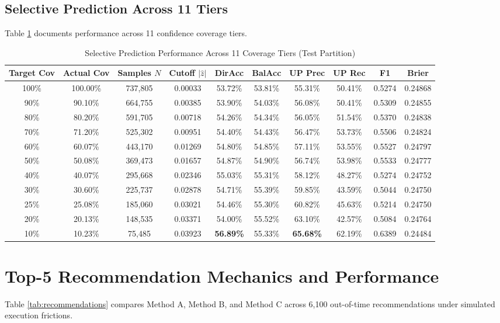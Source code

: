 \documentclass[11pt,a4paper]{article}
\begin{document}
\subsection{Selective Prediction Across 11 Tiers}
Table \ref{tab:selective} documents performance across 11 confidence coverage tiers.

\begin{table}[H]
\centering
\small
\caption{Selective Prediction Performance Across 11 Coverage Tiers (Test Partition)}
\label{tab:selective}
\begin{tabular}{cccccccccc}
\toprule
\textbf{Target Cov} & \textbf{Actual Cov} & \textbf{Samples $N$} & \textbf{Cutoff $|\hat{z}|$} & \textbf{DirAcc} & \textbf{BalAcc} & \textbf{UP Prec} & \textbf{UP Rec} & \textbf{F1} & \textbf{Brier} \\
\midrule
100\% & 100.00\% & 737,805 & 0.00033 & 53.72\% & 53.81\% & 55.31\% & 50.41\% & 0.5274 & 0.24868 \\
90\% & 90.10\% & 664,755 & 0.00385 & 53.90\% & 54.03\% & 56.08\% & 50.41\% & 0.5309 & 0.24855 \\
80\% & 80.20\% & 591,705 & 0.00718 & 54.26\% & 54.34\% & 56.05\% & 51.54\% & 0.5370 & 0.24838 \\
70\% & 71.20\% & 525,302 & 0.00951 & 54.40\% & 54.43\% & 56.47\% & 53.73\% & 0.5506 & 0.24824 \\
60\% & 60.07\% & 443,170 & 0.01269 & 54.80\% & 54.85\% & 57.11\% & 53.55\% & 0.5527 & 0.24797 \\
50\% & 50.08\% & 369,473 & 0.01657 & 54.87\% & 54.90\% & 56.74\% & 53.98\% & 0.5533 & 0.24777 \\
40\% & 40.07\% & 295,668 & 0.02346 & 55.03\% & 55.31\% & 58.12\% & 48.27\% & 0.5274 & 0.24752 \\
30\% & 30.60\% & 225,737 & 0.02878 & 54.71\% & 55.39\% & 59.85\% & 43.59\% & 0.5044 & 0.24750 \\
25\% & 25.08\% & 185,060 & 0.03021 & 54.46\% & 55.30\% & 60.82\% & 45.63\% & 0.5214 & 0.24750 \\
20\% & 20.13\% & 148,535 & 0.03371 & 54.00\% & 55.52\% & 63.10\% & 42.57\% & 0.5084 & 0.24764 \\
10\% & 10.23\% & 75,485 & 0.03923 & \textbf{56.89\%} & 55.33\% & \textbf{65.68\%} & 62.19\% & 0.6389 & 0.24484 \\
\bottomrule
\end{tabular}
\end{table}

\section{Top-5 Recommendation Mechanics and Performance}
Table \ref{tab:recommendations} compares Method A, Method B, and Method C across 6,100 out-of-time recommendations under simulated execution frictions.
\end{document}
